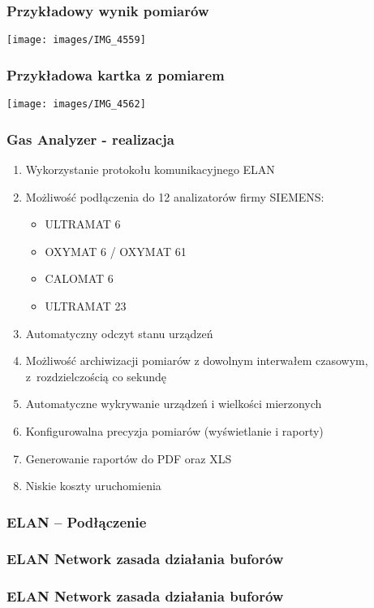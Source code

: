 \documentclass[ucs]{beamer}
\begin{document}
\begin{frame}
\frametitle{Przykładowy wynik pomiarów}
\begin{center}
\texttt{[image: images/IMG\_4559]}
\end{center}
\end{frame}

\begin{frame}
\frametitle{Przykładowa kartka z pomiarem}
\begin{center}
\texttt{[image: images/IMG\_4562]}
\end{center}
\end{frame}

\begin{frame}
\frametitle{Gas Analyzer - realizacja}
\begin{enumerate}
\item Wykorzystanie protokołu komunikacyjnego ELAN
\item Możliwość podłączenia do 12 analizatorów firmy SIEMENS:
\begin{itemize}
\item ULTRAMAT 6
\item OXYMAT 6 / OXYMAT 61
\item CALOMAT 6
\item ULTRAMAT 23
\end{itemize}
\item Automatyczny odczyt stanu urządzeń
\item Możliwość archiwizacji pomiarów z dowolnym interwałem czasowym, z~rozdzielczością co sekundę
\item Automatyczne wykrywanie urządzeń i wielkości mierzonych
\item Konfigurowalna precyzja pomiarów (wyświetlanie i raporty)
\item Generowanie raportów do PDF oraz XLS
\item Niskie koszty uruchomienia
\end{enumerate}
\end{frame}

\begin{frame}
\frametitle{ELAN -- Podłączenie}

\end{frame}

\begin{frame}
\frametitle{ELAN Network zasada działania buforów}

\end{frame}

\begin{frame}
\frametitle{ELAN Network zasada działania buforów}

\end{frame}
\end{document}
